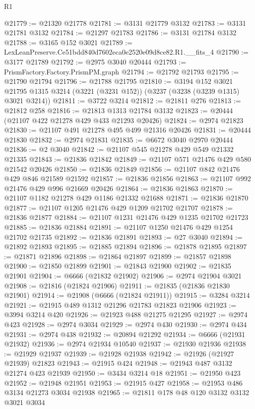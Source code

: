 \begin{lexlean}{R1}
\begin{coremodule}
@21779 := @21320 @21778
@21781 := @3131 @21779 @3132
@21783 := @3131 @21781 @3132
@21784 := @21297 @21783
@21786 := @3131 @21784 @3132
@21788 := @3165 @152 @3021
@21789 := LexLeanPreserve.Ce51bdd840d7602eca0e2520e09d8ce82.R1.__fits_4
@21790 := @3177 @21789
@21792 := @2975 @3040 @20444
@21793 := PrismFactory.Factory.PrismPM.graph
@21794 := @21792 @21793
@21795 := @21790 @21794
@21796 := @21788 @21795
@21810 := @3194
    @152
    @3021
    @21795
    @1315
    @3214
    (@3221 (@3231 @152))
    (@3237 (@3238 (@3239 @1315) @3021 @3214))
@21811 := @3722 @3214
@21812 := @21811 @276
@21813 := @21812 @258
@21816 := @21813 @1313 @21784 @3132
@21823 := @20444 (@21107 @422 @21278 @429 @433 @21293 @20426)
@21824 := @2974 @21823
@21830 := @21107 @491 @21278 @495 @499 @21316 @20426
@21831 := @20444 @21830
@21832 := @2974 @21831
@21835 := @6672 @3040 @2970 @20444
@21836 := @2 @3040
@21842 := @21107 @545 @21278 @429 @549 @21332 @21335
@21843 := @21836 @21842
@21849 := @21107 @571 @21476 @429 @580 @21542 @20426
@21850 := @21836 @21849
@21856 := @21107 @842 @21476 @429 @846 @21589 @21592
@21857 := @21836 @21856
@21863 := @21107 @992 @21476 @429 @996 @21669 @20426
@21864 := @21836 @21863
@21870 := @21107 @1182 @21278 @429 @1186 @21332 @21688
@21871 := @21836 @21870
@21877 := @21107 @1205 @21476 @429 @1209 @21702 @21707
@21878 := @21836 @21877
@21884 := @21107 @1231 @21476 @429 @1235 @21702 @21723
@21885 := @21836 @21884
@21891 := @21107 @1250 @21476 @429 @1254 @21702 @21735
@21892 := @21836 @21891
@21893 := @27 @3040
@21894 := @21892 @21893
@21895 := @21885 @21894
@21896 := @21878 @21895
@21897 := @21871 @21896
@21898 := @21864 @21897
@21899 := @21857 @21898
@21900 := @21850 @21899
@21901 := @21843 @21900
@21902 := @21835 @21901
@21904 := @6666 (@21832 @21902)
@21906 := @2974 @21904 @3021
@21908 := @21816 (@21824 @21906)
@21911 := @21835 (@21836 @21830 @21901)
@21914 := @21908 (@6666 (@21824 @21911))
@21915 := @3284 @3214
@21921 := @21915 @489 @1312 @21296 @21783 @21823 @21906
@21923 := @3994 @3214 @420
@21926 := @21923 @488 @21275 @21295
@21927 := @2974 @423
@21928 := @2974 @3034
@21929 := @2974 @430
@21930 := @2974 @434
@21931 := @2974 @438
@21932 := @20894 @21292
@21934 := @6666 (@21931 @21932)
@21936 := @2974 @21934 @10540
@21937 := @21930 @21936
@21938 := @21929 @21937
@21939 := @21928 @21938
@21942 := @21926 (@21927 @21939) @21823
@21943 := @21915 @424
@21948 := @21943 @487 @3132 @21274 @423 @21939
@21950 := @3434 @3214 @18
@21951 := @21950 @423
@21952 := @21948 @21951
@21953 := @21915 @427
@21958 := @21953 @486 @3134 @21273 @3034 @21938
@21965 := @21811 @178 @48 @120 @3132 @3132 @3021 @3034

\end{coremodule}
\end{lexlean}
